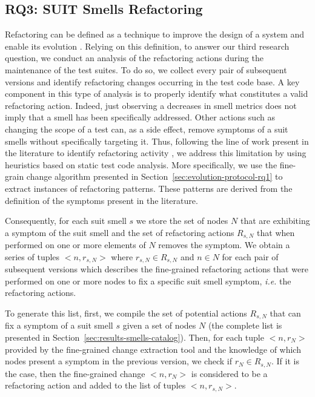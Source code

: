 \subsection{RQ3: SUIT Smells Refactoring}
\label{sec:methodology-smell-evolution}

Refactoring can be defined as a technique to improve the design of a system and enable its evolution \cite{Fowler1999}. Relying on this definition, to answer our third research question, we conduct an analysis of the refactoring actions during the maintenance of the test suites. To do so, we collect every pair of subsequent versions and identify refactoring changes occurring in the test code base. A key component in this type of analysis is to properly identify what constitutes a valid refactoring action. Indeed, just observing a decreases in smell metrics does not imply that a smell has been specifically addressed. Other actions such as changing the scope of a test can, as a side effect, remove symptoms of a \gls{suit} smells without specifically targeting it. Thus, following the line of work present in the literature to identify refactoring activity \cite{Tsantalis2013, Silva2017}, we address this limitation by using heuristics based on static test code analysis. More specifically, we use the fine-grain change algorithm presented in Section~\ref{sec:evolution-protocol-rq1} to extract instances of refactoring patterns. These patterns are derived from the definition of the symptoms present in the literature.

Consequently, for each \gls{suit} smell $s$ we store the set of nodes $N$ that are exhibiting a symptom of the \gls{suit} smell and the set of refactoring actions $R_{s,N}$ that when performed on one or more elements of $N$ removes the symptom. We obtain a series of tuples $<n, r_{s,N}>$ where $r_{s,N} \in R_{s,N}$ and $n \in N$ for each pair of subsequent versions which describes the fine-grained refactoring actions that were performed on one or more nodes to fix a specific \gls{suit} smell symptom, \emph{i.e.} the refactoring actions. 

To generate this list, first, we compile the set of potential actions $R_{s,N}$ that can fix a symptom of a \gls{suit} smell $s$ given a set of nodes $N$ (the complete list is presented in Section~\ref{sec:results-smells-catalog}). Then, for each tuple $<n, r_{N}>$ provided by the fine-grained change extraction tool and the knowledge of which nodes present a symptom in the previous version, we check if $r_{N} \in R_{s,N}$. If it is the case, then the fine-grained change $<n, r_{N}>$ is considered to be a refactoring action and added to the list of tuples $<n, r_{s,N}>$.

